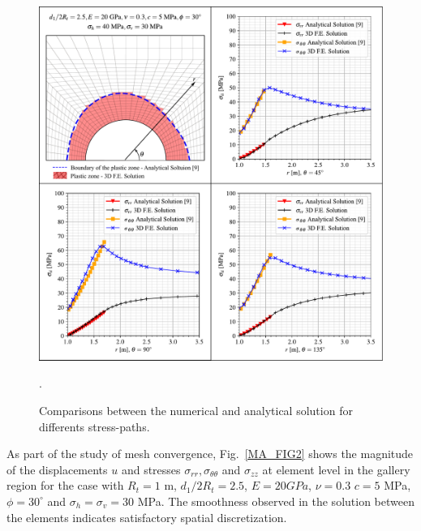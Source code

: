 \documentclass[a4paper,fleqn]{cas-sc}
\begin{document}
\begin{figure}[h!]
	\centering
	\includegraphics[scale=0.6]{MA_stresspaths.pdf}
	\caption{Comparisons between the numerical and analytical solution for differents stress-paths.}.
	\label{MA_stresspaths}
\end{figure}
\FloatBarrier

As part of the study of mesh convergence, Fig.~\ref{MA_FIG2} shows the magnitude of the displacements $u$ and stresses  $\sigma_{rr}, \sigma_{\theta \theta}$ and $\sigma_{zz}$ at element level in the gallery region for the case with $R_t = 1$ m, $d_1/2R_t = 2.5$, $E = 20GPa$, $\nu = 0.3$ $c=5$ MPa, $\phi = 30^\circ$ and $\sigma_h = \sigma_v = 30$ MPa. The smoothness observed in the solution between the elements indicates satisfactory spatial discretization.
\end{document}
